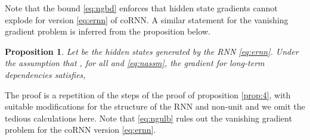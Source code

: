 \documentclass{article} \usepackage{iclr2021_conference,times}
\newtheorem{proposition}[theorem]{Proposition}
\begin{document}
Note that the bound \eqref{eq:ngbd} enforces that hidden state gradients cannot explode for version \eqref{eq:ernn} of coRNN. A similar statement for the vanishing gradient problem is inferred from the proposition below.
\begin{proposition}
\label{prop:n4}
Let  be the hidden states generated by the RNN \eqref{eq:ernn}. Under the assumption that , for all  and \eqref{eq:nassm}, the gradient for long-term dependencies satisfies,

\end{proposition}
The proof is a repetition of the steps of the proof of proposition \ref{prop:4}, with suitable modifications for the structure of the RNN and non-unit  and we omit the tedious calculations here. Note that \eqref{eq:ngulb} rules out the vanishing gradient problem for the coRNN version \eqref{eq:ernn}. 
\end{document}
